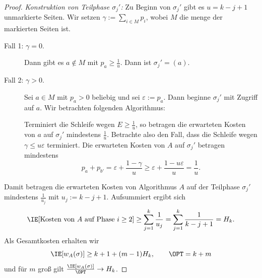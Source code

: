 \documentclass[language=ngerman,algolist]{TemplateLecture}
\begin{document}
\begin{proof}
    \emph{Konstruktion von Teilphase $\sigma_j'$:} Zu Beginn von $\sigma_j'$ gibt es $u = k - j + 1$ unmarkierte Seiten. Wir setzen $\gamma := \sum_{i \in M} p_i$, wobei $M$ die menge der markierten Seiten ist.
    \begin{description}
        \item[Fall 1: $\gamma = 0$.] Dann gibt es $a \notin M$ mit $p_a \geq \frac{1}{u}$. Dann ist $\sigma_j' = (a)$.
        \item[Fall 2: $\gamma > 0$.] Sei $a \in M$ mit $p_a > 0$ beliebig und sei $\varepsilon := p_a$. Dann beginne $\sigma_j'$ mit Zugriff auf $a$. Wir betrachten folgenden Algorithmus:
        \begin{algorithmic}[1]
            \EndWhile{}
        \end{algorithmic}
        Terminiert die Schleife wegen $E \geq \frac{1}{u}$, so betragen die erwarteten Kosten von $a$ auf $\sigma_j'$ mindestens $\frac{1}{u}$. Betrachte also den Fall, dass die Schleife wegen $\gamma \leq u \varepsilon$ terminiert. Die erwarteten Kosten von $A$ auf $\sigma_j'$ betragen mindestens
        \begin{equation*}
            p_a + p_{b'} = \varepsilon + \frac{1 - \gamma}{u} \geq \varepsilon + \frac{1 - u\varepsilon}{u} = \frac{1}{u}.
        \end{equation*}
    \end{description} 
    Damit betragen die erwarteten Kosten von Algorithmus $A$ auf der Teilphase $\sigma_j'$ mindestens $\frac{1}{u_j}$ mit $u_j := k - j + 1$. Aufsummiert ergibt sich
    \begin{equation*}
        \IE[\text{Kosten von $A$ auf Phase $i \geq 2$}] \geq \sum_{j = 1}^k \frac{1}{u_j} = \sum_{j = 1}^k \frac{1}{k - j + 1} = H_k.
    \end{equation*}
    Als Gesamtkosten erhalten wir
    \begin{equation*}
        \IE[w_A(\sigma)] \geq k + 1 + (m-1) H_k, \quad \quad \OPT = k + m
    \end{equation*}
    und für $m$ groß gilt $\frac{\IE[w_A(\sigma)]}{\OPT} \to H_k$.
\end{proof}
\end{document}
